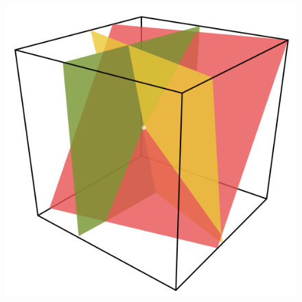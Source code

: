 \documentclass[12pt,a4paper,landscape]{report}
\begin{document}
\begin{figure}[H]
		\includegraphics[width=0.3\paperwidth]{../images/blakeley3.png}
	\end{figure}
\end{document}

